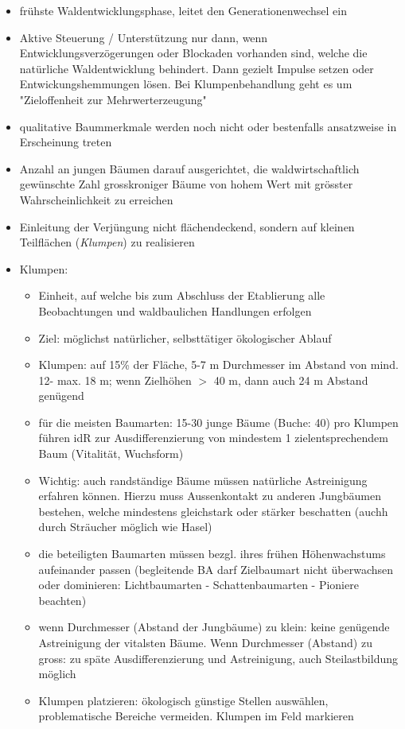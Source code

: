 \documentclass{article}
\begin{document}
\begin{itemize}

  \item frühste Waldentwicklungsphase, leitet den Generationenwechsel ein
  
  \item Aktive Steuerung / Unterstützung nur dann, wenn Entwicklungsverzögerungen oder Blockaden vorhanden sind, welche die natürliche Waldentwicklung behindert. Dann gezielt Impulse setzen oder Entwickungshemmungen lösen. Bei Klumpenbehandlung geht es um "Zieloffenheit zur Mehrwerterzeugung"
    
  \item qualitative Baummerkmale werden noch nicht oder bestenfalls ansatzweise in Erscheinung treten
  
  \item Anzahl an jungen Bäumen darauf ausgerichtet, die waldwirtschaftlich gewünschte Zahl grosskroniger Bäume von hohem Wert mit grösster Wahrscheinlichkeit zu erreichen
  
  \item Einleitung der Verjüngung nicht flächendeckend, sondern auf kleinen Teilflächen (\textit{Klumpen}) zu realisieren
  
  \item Klumpen:
  
    \begin{itemize}
      \item Einheit, auf welche bis zum Abschluss der Etablierung alle Beobachtungen und waldbaulichen Handlungen erfolgen
      \item Ziel: möglichst natürlicher, selbsttätiger ökologischer Ablauf
      \item Klumpen: auf 15\% der Fläche, 5-7 m Durchmesser im Abstand von mind. 12- max. 18 m; wenn Zielhöhen $>$ 40 m, dann auch 24 m Abstand genügend 
  	  \item für die meisten Baumarten: 15-30 junge Bäume (Buche: 40) pro Klumpen führen idR zur Ausdifferenzierung von mindestem 1 zielentsprechendem Baum (Vitalität, Wuchsform)
  	  \item Wichtig: auch randständige Bäume müssen natürliche Astreinigung erfahren können. Hierzu muss Aussenkontakt zu anderen Jungbäumen bestehen, welche mindestens gleichstark oder stärker beschatten (auchh durch Sträucher möglich wie Hasel)
  	  \item die beteiligten Baumarten müssen bezgl. ihres frühen Höhenwachstums aufeinander passen (begleitende BA darf Zielbaumart nicht überwachsen oder dominieren: Lichtbaumarten - Schattenbaumarten - Pioniere beachten)
  	  \item wenn Durchmesser (Abstand der Jungbäume) zu klein: keine genügende Astreinigung der vitalsten Bäume. Wenn Durchmesser (Abstand) zu gross: zu späte Ausdifferenzierung und Astreinigung, auch Steilastbildung möglich 
  	  \item Klumpen platzieren: ökologisch günstige Stellen auswählen, problematische Bereiche vermeiden. Klumpen im Feld markieren
    \end{itemize}
  

\end{itemize}
\end{document}
